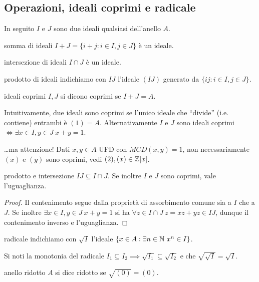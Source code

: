 \subsection{Operazioni, ideali coprimi e radicale}
In seguito $I$ e $J$ sono due ideali qualsiasi dell'anello $A$.
\begin{definition}{somma di ideali}
    $I + J = \{ i + j : i \in I, j \in J \}$ è un ideale.
\end{definition}
\begin{definition}{intersezione di ideali}
    $I \cap J$ è un ideale.
\end{definition}
\begin{definition}{prodotto di ideali}
    indichiamo con $IJ$ l'ideale $(IJ)$ generato da $\{ij : i \in I, j \in J\}$.
\end{definition}
\begin{definition}{ideali coprimi}
    $I, J$ si dicono coprimi se $I + J = A$.
    
    Intuitivamente, due ideali sono coprimi se l'unico ideale che ``divide'' (i.e. contiene) entrambi è $(1) = A$. Alternativamente $I$ e $J$ sono ideali coprimi $\Leftrightarrow \exists x \in I, y \in J \ x + y = 1$.
    
    \dots ma attenzione! Dati $x, y \in A$ UFD con $MCD(x, y) = 1$, non necessariamente $(x)$ e $(y)$ sono coprimi, vedi $(2), (x) \in \mathbb{Z}[x]$.
\end{definition}
\begin{proposition}{prodotto e intersezione}
    $IJ \subseteq I \cap J$. Se inoltre $I$ e $J$ sono coprimi, vale l'uguaglianza. %
\end{proposition}
\begin{proof}
    Il contenimento segue dalla proprietà di assorbimento comune sia a $I$ che a $J$. Se inoltre $\exists x \in I, y \in J \ x + y = 1$ si ha $\forall z \in I \cap J \ z = xz + yz \in IJ$, dunque il contenimento inverso e l'uguaglianza.
\end{proof}
\begin{definition}{radicale}
    indichiamo con $\sqrt{I}$ l'ideale $\{x \in A : \exists n \in \mathbb{N} \ x^n \in I\}$.
\end{definition}
Si noti la monotonia del radicale $I_1 \subseteq I_2 \implies \sqrt{I_1} \subseteq \sqrt{I_2}$ e che $\sqrt{\sqrt{I}} = \sqrt{I}$.
\begin{definition}{anello ridotto}
    $A$ si dice ridotto se $\sqrt{(0)} = (0)$.
\end{definition}
